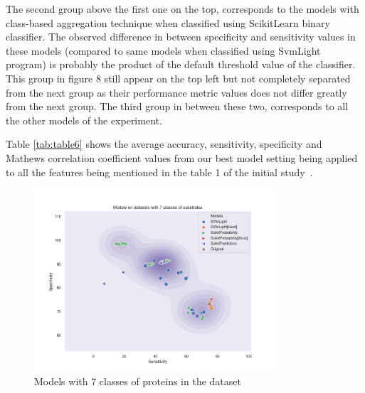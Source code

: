 The second group above the first one on the top, corresponds to the models with class-based aggregation technique when classified 
using ScikitLearn binary classifier. The observed difference in between specificity and sensitivity values in these models 
(compared to same models when classified using SvmLight program) is probably the product of the default threshold value 
of the classifier. This group in figure 8 still appear on the top left but not completely separated from the next group as their 
performance metric values does not differ greatly from the next group. 
The third group in between these two, corresponds to all the other models of the experiment.

Table \ref{tab:table6} shows the average accuracy, sensitivity, specificity and Mathews correlation coefficient values 
from our best model setting being applied to all the features being mentioned in the table 1 of the 
initial study~\cite{mishra2014prediction}.

\begin{figure}
    \begin{small}
        \begin{center}
            \includegraphics[width=0.8\textwidth]{figures/fig71}
        \end{center}
        \caption{Models with 7 classes of proteins in the dataset}
        \label{fig:figure7}
    \end{small}
\end{figure}

